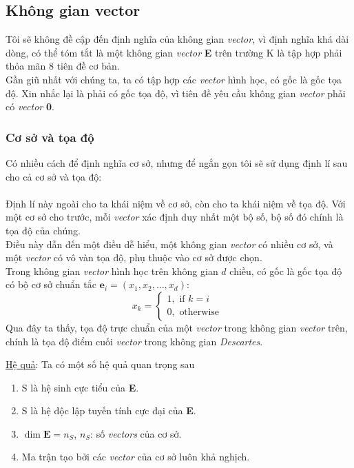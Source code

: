 \documentclass{article}
\begin{document}
\subsection{Không gian vector}
Tôi sẽ không đề cập đến định nghĩa của không gian \textit{vector}, vì định nghĩa khá dài dòng, có thể tóm tắt là một không gian \textit{vector} \textbf{E} trên trường K là tập hợp phải thỏa mãn 8 tiên đề cơ bản. \\
Gần giũ nhất với chúng ta, ta có tập hợp các \textit{vector} hình học, có gốc là gốc tọa độ. Xin nhắc lại là phải có gốc tọa độ, vì tiên đề yêu cầu không gian \textit{vector} phải có \textit{vector} \textbf{0}.
\subsubsection*{Cơ sở và tọa độ}
\label{n1}
Có nhiều cách để định nghĩa cơ sở, nhưng để ngắn gọn tôi sẽ sử dụng định lí sau cho cả cơ sở và tọa độ:\\
\phantom{a}\\
Định lí này ngoài cho ta khái niệm về cơ sở, còn cho ta khái niệm về tọa độ. Với một cơ sở cho trước, mỗi \textit{vector} xác định duy nhất một bộ số, bộ số đó chính là tọa độ của chúng.\\
Điều này dẫn đến một điều dễ hiểu, một không gian \textit{vector} có nhiều cơ sở, và một \textit{vector} có vô vàn tọa độ, phụ thuộc vào cơ sở được chọn.\\
Trong không gian \textit{vector} hình học trên không gian $d$ chiều, có gốc là gốc tọa độ có bộ cơ sở chuẩn tắc ${\textbf{e}_i} = (x_1,x_2,\ldots, x_d)$:
$$
x_k = 
\begin{cases}
1, \text{ if } k = i\\
0, \text{ otherwise }
\end{cases}
$$
Qua đây ta thấy, tọa độ trực chuẩn của một \textit{vector} trong không gian \textit{vector} trên, chính là tọa độ điểm cuối \textit{vector} trong không gian \textit{Descartes}.

\underline{Hệ quả}:
Ta có một số hệ quả quan trọng sau
\begin{enumerate}
    \item S là hệ sinh cực tiểu của \textbf{E}.
    \item S là hệ độc lập tuyến tính cực đại của \textbf{E}.
    \item $\dim \textbf{E} = n_S$, $n_S$: số \textit{vectors} của cơ sở.
    \item Ma trận tạo bởi các \textit{vector} của cơ sở luôn khả nghịch.
\end{enumerate}
\end{document}
